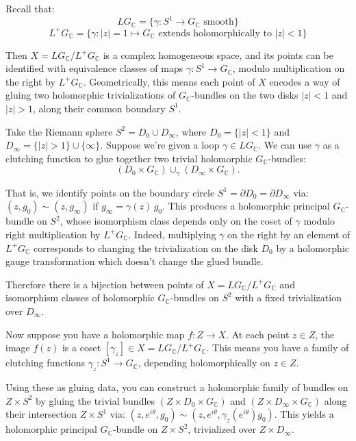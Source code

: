 \documentclass[12pt]{article}
\begin{document}
\begin{remark}
    Recall that:
    \[
    LG_\mathbb{C} = \{ \gamma : S^1 \to G_\mathbb{C} \text{ smooth} \}
    \]
    \[
    L^+G_\mathbb{C} = \{ \gamma : |z|=1 \mapsto G_\mathbb{C} \text{ extends holomorphically to } |z|<1 \}
    \]

    Then $X = LG_\mathbb{C} / L^+G_\mathbb{C}$ is a complex homogeneous space, and its points can be identified with equivalence classes of maps $\gamma : S^1 \to G_\mathbb{C}$, modulo multiplication on the right by $L^+G_\mathbb{C}$. Geometrically, this means each point of $X$ encodes a way of gluing two holomorphic trivializations of $G_\mathbb{C}$-bundles on the two disks $|z|<1$ and $|z|>1$, along their common boundary $S^1$.

    Take the Riemann sphere $S^2 = D_0 \cup D_\infty$, where $D_0 = \{ |z| < 1 \}$ and $D_\infty = \{ |z| > 1 \} \cup \{\infty\}$. Suppose we're given a loop $\gamma \in LG_\mathbb{C}$. We can use $\gamma$ as a clutching function to glue together two trivial holomorphic $G_\mathbb{C}$-bundles:
    \[
    (D_0 \times G_\mathbb{C}) \cup_\gamma (D_\infty \times G_\mathbb{C}).
    \]

    That is, we identify points on the boundary circle $S^1 = \partial D_0 = \partial D_\infty$ via: $(z, g_0) \sim (z, g_\infty)$ if $g_\infty = \gamma(z)\, g_0$. This produces a holomorphic principal $G_\mathbb{C}$-bundle on $S^2$, whose isomorphism class depends only on the coset of $\gamma$ modulo right multiplication by $L^+G_\mathbb{C}$. Indeed, multiplying $\gamma$ on the right by an element of $L^+G_\mathbb{C}$ corresponds to changing the trivialization on the disk $D_0$ by a holomorphic gauge transformation which doesn't change the glued bundle.

    Therefore there is a bijection between points of $X = LG_\mathbb{C} / L^+G_\mathbb{C}$ and isomorphism classes of holomorphic $G_\mathbb{C}$-bundles on $S^2$ with a fixed trivialization over $D_\infty$.

    Now suppose you have a holomorphic map $f : Z \to X$. At each point $z \in Z$, the image $f(z)$ is a coset $[\gamma_z] \in X = LG_\mathbb{C} / L^+G_\mathbb{C}$. This means you have a family of clutching functions $\gamma_z : S^1 \to G_\mathbb{C}$, depending holomorphically on $z \in Z$.

    Using these as gluing data, you can construct a holomorphic family of bundles on $Z \times S^2$ by gluing the trivial bundles $(Z \times D_0 \times G_\mathbb{C})$ and $(Z \times D_\infty \times G_\mathbb{C})$ along their intersection $Z \times S^1$ via: $(z, e^{i\theta}, g_0) \sim (z, e^{i\theta}, \gamma_z(e^{i\theta}) g_0)$. This yields a holomorphic principal $G_\mathbb{C}$-bundle on $Z \times S^2$, trivialized over $Z \times D_\infty$.


\end{remark}
\end{document}

